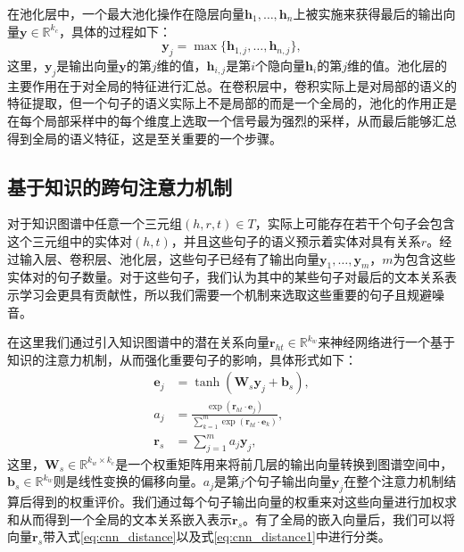 在池化层中，一个最大池化操作在隐层向量${\mathbf{h}_1, \ldots , \mathbf{h}_n}$上被实施来获得最后的输出向量$\mathbf{y} \in \mathbb{R}^{k_c} $，具体的过程如下：
\begin{equation}
\mathbf{y}_{j} = \max \{\mathbf{h}_{1,j}, \ldots, \mathbf{h}_{n,j} \},
\end{equation}
这里，$\mathbf{y}_{j}$是输出向量$\mathbf{y}$的第$j$维的值，$\mathbf{h}_{i,j}$是第$i$个隐向量$\mathbf{h}_i$的第$j$维的值。池化层的主要作用在于对全局的特征进行汇总。在卷积层中，卷积实际上是对局部的语义的特征提取，但一个句子的语义实际上不是局部的而是一个全局的，池化的作用正是在每个局部采样中的每个维度上选取一个信号最为强烈的采样，从而最后能够汇总得到全局的语义特征，这是至关重要的一个步骤。

\subsection{基于知识的跨句注意力机制}

对于知识图谱中任意一个三元组$(h, r, t) \in T$，实际上可能存在若干个句子会包含这个三元组中的实体对$(h, t)$，并且这些句子的语义预示着实体对具有关系$r$。经过输入层、卷积层、池化层，这些句子已经有了输出向量${\mathbf{y}_1, \ldots , \mathbf{y}_m}$，$m$为包含这些实体对的句子数量。对于这些句子，我们认为其中的某些句子对最后的文本关系表示学习会更具有贡献性，所以我们需要一个机制来选取这些重要的句子且规避噪音。

在这里我们通过引入知识图谱中的潜在关系向量$\mathbf{r}_{ht} \in \mathbb{R}^{k_w} $来神经网络进行一个基于知识的注意力机制，从而强化重要句子的影响，具体形式如下：
\begin{align}
\mathbf{e}_j & = \tanh(\mathbf{W}_s\mathbf{y}_j+\mathbf{b}_s), \\\nonumber
a_j & =\frac{\exp(\mathbf{r}_{ht}\cdot\mathbf{e}_j)}{\sum_{k = 1}^{m} \exp(\mathbf{r}_{ht}\cdot\mathbf{e}_k)}, \\\nonumber
\mathbf{r}_s & = \sum_{j = 1}^{m} a_j\mathbf{y}_j,
\end{align}
这里，$\mathbf{W}_s \in \mathbb{R}^{k_w \times k_c}$是一个权重矩阵用来将前几层的输出向量转换到图谱空间中，$\mathbf{b}_s \in \mathbb{R}^{k_w}$则是线性变换的偏移向量。$a_j$是第$j$个句子输出向量$\mathbf{y}_j$在整个注意力机制结算后得到的权重评价。我们通过每个句子输出向量的权重来对这些向量进行加权求和从而得到一个全局的文本关系嵌入表示$\mathbf{r}_s$。有了全局的嵌入向量后，我们可以将向量$\mathbf{r}_s$带入式\ref{eq:cnn_distance}以及式\ref{eq:cnn_distance1}中进行分类。



